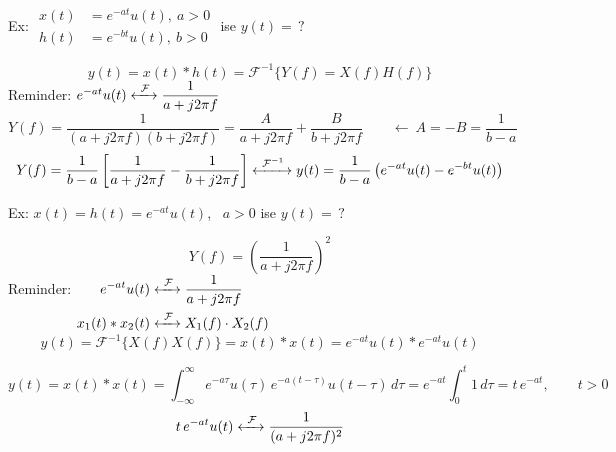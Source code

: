 \documentclass[11pt,a4paper]{article}
\begin{document}
\begin{ornek}
Ex: \quad $\begin{aligned} x(t)&=e^{-at}u(t),\ a>0\\ h(t)&=e^{-bt}u(t),\ b>0\end{aligned}$ \qquad ise $y(t)=\,?$
\end{ornek}
\[ y(t)=x(t)*h(t)=\mathcal{F}^{-1}\bigl\{Y(f)=X(f)H(f)\bigr\} \]
Reminder: \quad $e^{-at}u(t) \xleftrightarrow{\ \mathcal{F}\ } \dfrac{1}{a+j2\pi f}$
\[ Y(f)=\frac{1}{(a+j2\pi f)(b+j2\pi f)}=\frac{A}{a+j2\pi f}+\frac{B}{b+j2\pi f} \qquad\longleftarrow\ A=-B=\frac{1}{b-a} \]
\[ Y(f)=\frac{1}{b-a}\left[\frac{1}{a+j2\pi f}-\frac{1}{b+j2\pi f}\right] \xleftrightarrow{\ \mathcal{F}^{-1}\ } y(t)=\frac{1}{b-a}\left(e^{-at}u(t)-e^{-bt}u(t)\right) \]

\begin{ornek}
Ex: $x(t)=h(t)=e^{-at}u(t)$, \ $a>0$ ise $y(t)=\,?$
\end{ornek}
\[ Y(f)=\left(\frac{1}{a+j2\pi f}\right)^2 \]
Reminder: \quad $\begin{aligned}[t] e^{-at}u(t) &\xleftrightarrow{\ \mathcal{F}\ } \frac{1}{a+j2\pi f}\\ x_1(t)*x_2(t) &\xleftrightarrow{\ \mathcal{F}\ } X_1(f)\cdot X_2(f)\end{aligned}$
\[ y(t)=\mathcal{F}^{-1}\bigl\{X(f)X(f)\bigr\}=x(t)*x(t)=e^{-at}u(t)*e^{-at}u(t) \]
\begin{center}
\hspace{1.5cm}
\end{center}
\[ y(t)=x(t)*x(t)=\int_{-\infty}^{\infty} e^{-a\tau}u(\tau)\,e^{-a(t-\tau)}u(t-\tau)\,d\tau=e^{-at}\int_{0}^{t} 1\,d\tau=t\,e^{-at}, \qquad t>0 \]
\[ t\,e^{-at}u(t) \xleftrightarrow{\ \mathcal{F}\ } \frac{1}{(a+j2\pi f)^2} \]
\end{document}
